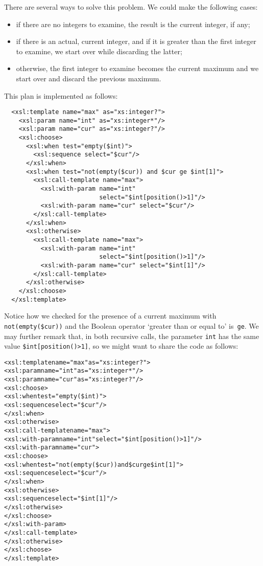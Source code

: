 There are several ways to solve this problem. We could make the
following cases:
\begin{itemize}

  \item if there are no integers to examine, the result is the current
    integer, if any;

  \item if there is an actual, current integer, and if it is greater
    than the first integer to examine, we start over while discarding
    the latter;

  \item otherwise, the first integer to examine becomes the current
    maximum and we start over and discard the previous maximum.

\end{itemize}
This plan is implemented as follows:
\begin{verbatim}
  <xsl:template name="max" as="xs:integer?">
    <xsl:param name="int" as="xs:integer*"/>
    <xsl:param name="cur" as="xs:integer?"/>
    <xsl:choose>
      <xsl:when test="empty($int)">
        <xsl:sequence select="$cur"/>
      </xsl:when>
      <xsl:when test="not(empty($cur)) and $cur ge $int[1]">
        <xsl:call-template name="max">
          <xsl:with-param name="int"
                          select="$int[position()>1]"/>
          <xsl:with-param name="cur" select="$cur"/>
        </xsl:call-template>
      </xsl:when>
      <xsl:otherwise>
        <xsl:call-template name="max">
          <xsl:with-param name="int"
                          select="$int[position()>1]"/>
          <xsl:with-param name="cur" select="$int[1]"/>
        </xsl:call-template>
      </xsl:otherwise>
    </xsl:choose>
  </xsl:template>
\end{verbatim}
Notice how we checked for the presence of a current maximum with
\texttt{not(empty(\$cur))} and the \XPath Boolean operator `greater
than or equal to' is~\texttt{ge}. We may further remark that, in both
recursive calls, the parameter \texttt{int} has the same value
\texttt{\$int[position()>1]}, so we might want to share the code as
follows:
\begin{alltt}
<xsl:template name="max" as="xs:integer?">
  <xsl:param name="int" as="xs:integer*"/>
  <xsl:param name="cur" as="xs:integer?"/>
  <xsl:choose>
    <xsl:when test="empty(\$int)">
      <xsl:sequence select="\$cur"/>
    </xsl:when>
    <xsl:otherwise>
      <xsl:call-template name="max">
        <xsl:with-param name="int" select="\$int[position()>1]"/>
        <xsl:with-param name="cur">
          <xsl:choose>
            <xsl:when\!\! test="not(empty(\$cur)) and \$cur\! ge \!\$int[1]">
              <xsl:sequence select="\$cur"/>
            </xsl:when>
            <xsl:otherwise>
              <xsl:sequence select="\$int[1]"/>
            </xsl:otherwise>
          </xsl:choose>
        </xsl:with-param>
      </xsl:call-template>
    </xsl:otherwise>
  </xsl:choose>
</xsl:template>
\end{alltt}
